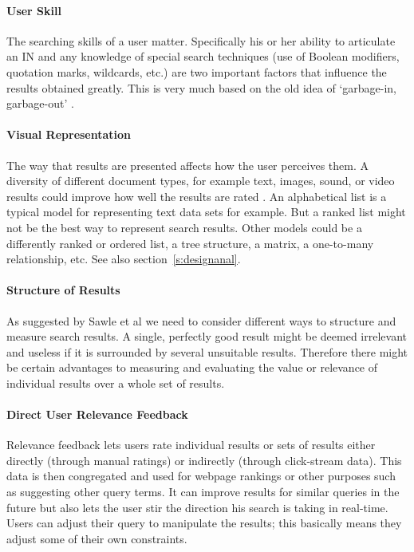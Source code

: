 \paragraph{User Skill} The searching skills of a user matter. Specifically his or her ability to articulate an \acf{IN} and any knowledge of special search techniques (use of Boolean modifiers, quotation marks, wildcards, etc.) are two important factors that influence the results obtained greatly. This is very much based on the old idea of `garbage-in, garbage-out' \autocite{Lidwell2010}.

\paragraph{Visual Representation} The way that results are presented affects how the user perceives them. A diversity of different document types, for example text, images, sound, or video results could improve how well the results are rated \autocite{Sawle2011}. An alphabetical list is a typical model for representing text data sets for example. But a ranked list might not be the best way to represent search results. Other models could be a differently ranked or ordered list, a tree structure, a matrix, a one-to-many relationship, etc. See also section~\ref{s:designanal}.

\paragraph{Structure of Results} As suggested by Sawle et al \autocite*{Sawle2011} we need to consider different ways to structure and measure search results. A single, perfectly good result might be deemed irrelevant and useless if it is surrounded by several unsuitable results. Therefore there might be certain advantages to measuring and evaluating the value or relevance of individual results over a whole set of results.

\paragraph{Direct User Relevance Feedback} Relevance feedback lets users rate individual results or sets of results either directly (through manual ratings) or indirectly (through click-stream data). This data is then congregated and used for webpage rankings or other purposes such as suggesting other query terms. It can improve results for similar queries in the future but also lets the user stir the direction his search is taking in real-time. Users can adjust their query to manipulate the results; this basically means they adjust some of their own constraints.

